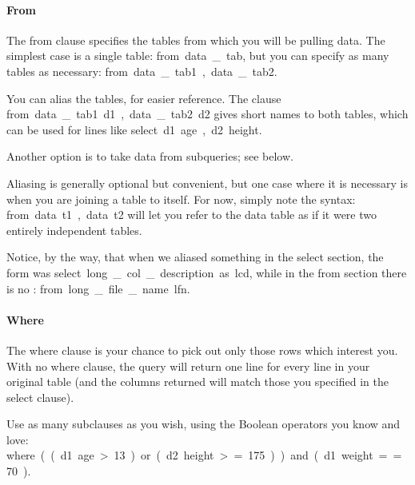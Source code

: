 \paragraph{From} The \si{from} clause specifies the tables from which
you will be pulling data. The simplest case is a single table: \si{from data\_tab}, but you can specify as many tables as necessary: \si{from data\_tab1, data\_tab2}. 

You can alias the tables, for easier reference. The clause \si{from
data\_tab1 d1, data\_tab2 d2} gives short names to both tables, which
can be used for lines like \si{select d1.age, d2.height}.

Another option is to take data from subqueries; see below.

Aliasing is generally optional but convenient, but one case where
it is necessary is when you are joining a table to itself.
For now, simply note the syntax: \si{from data t1, data t2} will let
you refer to the \si{data} table as if it were two entirely independent
tables. 

Notice, by the way, that when we aliased something in the \si{select}
section, the form was \si{select long\_col\_description as lcd}, while
in the \si{from} section there is no : \si{from long\_file\_name lfn}.

\paragraph{Where}
The \si{where} clause is your chance to pick out only those rows which
interest you. With no \si{where} clause, the query will return one line
for every line in your original table (and the columns returned will
match those you specified in the \si{select} clause).

Use as many subclauses as you wish, using the Boolean operators you
know and love: \si{where ((d1.age > 13) or (d2.height >= 175)) and
(d1.weight == 70)}.

